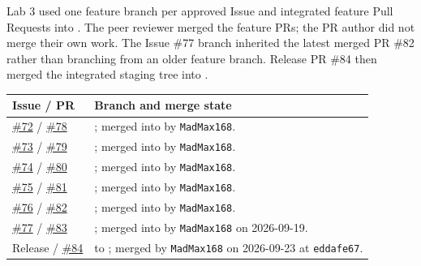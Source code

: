 \documentclass[10pt,a4paper]{article}
\begin{document}
Lab 3 used one feature branch per approved Issue and integrated feature Pull
Requests into . The peer reviewer merged the feature PRs;
the PR author did not merge their own work. The Issue \#77 branch inherited
the latest merged PR \#82 rather than branching from an older feature branch.
Release PR \#84 then merged the integrated staging tree into .

\begin{center}
\small
\begin{tabularx}{\linewidth}{@{}p{32mm}Y@{}}
\toprule
Issue / PR & Branch and merge state \\
\midrule
\href{https://github.com/ovenmakemeheat/toktickit/issues/72}{\#72} / \href{https://github.com/ovenmakemeheat/toktickit/pull/78}{\#78} & ; merged into  by \texttt{MadMax168}. \\
\href{https://github.com/ovenmakemeheat/toktickit/issues/73}{\#73} / \href{https://github.com/ovenmakemeheat/toktickit/pull/79}{\#79} & ; merged into  by \texttt{MadMax168}. \\
\href{https://github.com/ovenmakemeheat/toktickit/issues/74}{\#74} / \href{https://github.com/ovenmakemeheat/toktickit/pull/80}{\#80} & ; merged into  by \texttt{MadMax168}. \\
\href{https://github.com/ovenmakemeheat/toktickit/issues/75}{\#75} / \href{https://github.com/ovenmakemeheat/toktickit/pull/81}{\#81} & ; merged into  by \texttt{MadMax168}. \\
\href{https://github.com/ovenmakemeheat/toktickit/issues/76}{\#76} / \href{https://github.com/ovenmakemeheat/toktickit/pull/82}{\#82} & ; merged into  by \texttt{MadMax168}. \\
\href{https://github.com/ovenmakemeheat/toktickit/issues/77}{\#77} / \href{https://github.com/ovenmakemeheat/toktickit/pull/83}{\#83} & ; merged into  by \texttt{MadMax168} on 2026-09-19. \\
Release / \href{https://github.com/ovenmakemeheat/toktickit/pull/84}{\#84} &  to ; merged by \texttt{MadMax168} on 2026-09-23 at \texttt{eddafe67}. \\
\bottomrule
\end{tabularx}
\end{center}
\end{document}
